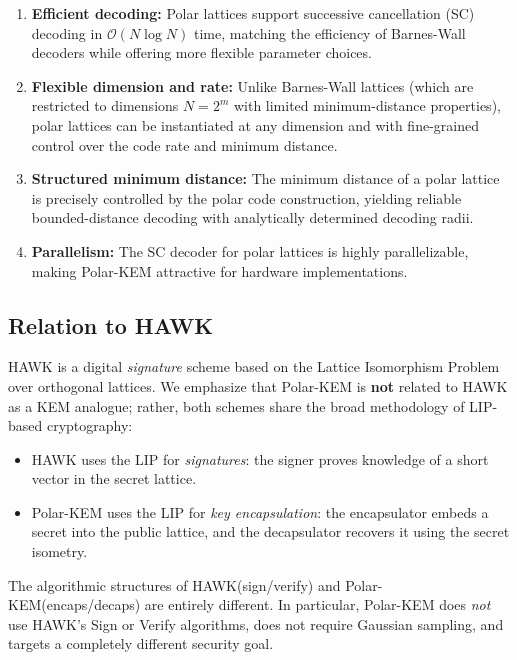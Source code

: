 \documentclass[11pt,a4paper]{article}
\newcommand{\polarKem}{\textsf{Polar-KEM}\xspace}
\newcommand{\lipPrb}{\textsf{LIP}\xspace}
\newcommand{\hwkRef}{\textsf{HAWK}\xspace}
\begin{document}
\begin{enumerate}[leftmargin=2em]
\item \textbf{Efficient decoding:} Polar lattices support successive cancellation (SC) decoding in $\mathcal{O}(N \log N)$ time, matching the efficiency of Barnes-Wall decoders while offering more flexible parameter choices.
\item \textbf{Flexible dimension and rate:} Unlike Barnes-Wall lattices (which are restricted to dimensions $N = 2^m$ with limited minimum-distance properties), polar lattices can be instantiated at any dimension and with fine-grained control over the code rate and minimum distance.
\item \textbf{Structured minimum distance:} The minimum distance of a polar lattice is precisely controlled by the polar code construction, yielding reliable bounded-distance decoding with analytically determined decoding radii.
\item \textbf{Parallelism:} The SC decoder for polar lattices is highly parallelizable, making \polarKem attractive for hardware implementations.
\end{enumerate}

\subsection{Relation to HAWK}\label{sec:relation-hawk}

\hwkRef\cite{HAWK} is a digital \emph{signature} scheme based on the Lattice Isomorphism Problem over orthogonal lattices. We emphasize that \polarKem is \textbf{not} related to \hwkRef as a KEM analogue; rather, both schemes share the broad methodology of \lipPrb-based cryptography:

\begin{itemize}[leftmargin=2em]
\item \hwkRef uses the \lipPrb for \emph{signatures}: the signer proves knowledge of a short vector in the secret lattice.
\item \polarKem uses the \lipPrb for \emph{key encapsulation}: the encapsulator embeds a secret into the public lattice, and the decapsulator recovers it using the secret isometry.
\end{itemize}

The algorithmic structures of \hwkRef (sign/verify) and \polarKem (encaps/decaps) are entirely different. In particular, \polarKem does \emph{not} use \hwkRef's Sign or Verify algorithms, does not require Gaussian sampling, and targets a completely different security goal.
\end{document}
